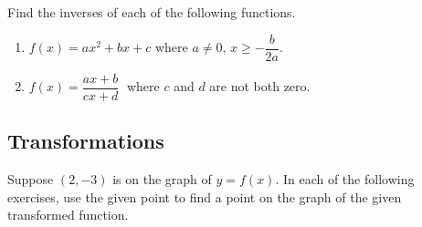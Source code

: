 \documentclass[12pt]{book}
\theoremstyle{definition}
\begin{document}
Find the inverses of each of the following functions.

\begin{enumerate}[resume]
\item $f(x) = ax^{2} + bx + c$ where $a \neq 0, \, x \geq -\dfrac{b}{2a}$.
\item $f(x) = \dfrac{ax + b}{cx + d}\;$ where $c$ and $d$ are not both zero.
\end{enumerate}

\subsection*{Transformations}
Suppose $(2,-3)$ is on the graph of $y = f(x)$.  In each of the following exercises, use the given point to find a point on the graph of the given transformed function.
\end{document}
